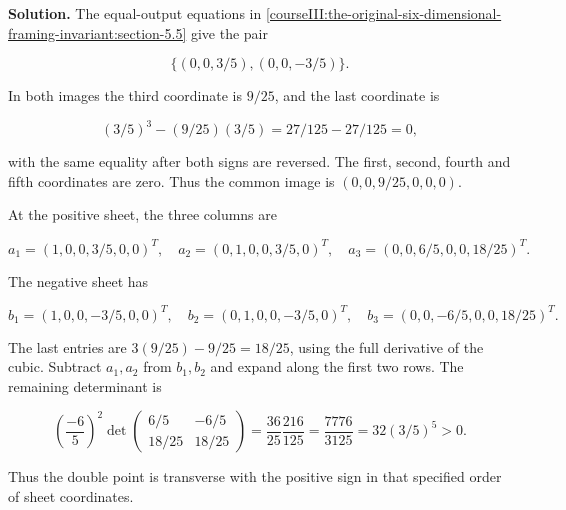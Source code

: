 \textbf{Solution.} The equal-output equations in \cref{courseIII:the-original-six-dimensional-framing-invariant:section-5.5} give the pair

\begin{equation}
\{(0,0,3/5),(0,0,-3/5)\}.
 \label{courseIII:the-original-six-dimensional-framing-invariant:eq:10.1}
\end{equation}

In both images the third coordinate is \(9/25\), and the last coordinate is

\begin{equation}
(3/5)^3-(9/25)(3/5)=27/125-27/125=0,
 \label{courseIII:the-original-six-dimensional-framing-invariant:eq:10.2}
\end{equation}

with the same equality after both signs are reversed. The first, second, fourth and fifth coordinates are zero. Thus the common image is \((0,0,9/25,0,0,0)\).

At the positive sheet, the three columns are

\begin{equation}
a_1=(1,0,0,3/5,0,0)^T,\quad
 a_2=(0,1,0,0,3/5,0)^T,\quad
 a_3=(0,0,6/5,0,0,18/25)^T.
 \label{courseIII:the-original-six-dimensional-framing-invariant:eq:10.3}
\end{equation}

The negative sheet has

\begin{equation}
b_1=(1,0,0,-3/5,0,0)^T,\quad
 b_2=(0,1,0,0,-3/5,0)^T,\quad
 b_3=(0,0,-6/5,0,0,18/25)^T.
 \label{courseIII:the-original-six-dimensional-framing-invariant:eq:10.4}
\end{equation}

The last entries are \(3(9/25)-9/25=18/25\), using the full derivative of the cubic. Subtract \(a_1,a_2\) from \(b_1,b_2\) and expand along the first two rows. The remaining determinant is

\begin{equation}
\left(\frac{-6}{5}\right)^2
   \det\begin{pmatrix}6/5&-6/5\\18/25&18/25\end{pmatrix}
    =\frac{36}{25}\frac{216}{125}
    =\frac{7776}{3125}
    =32(3/5)^5>0.
 \label{courseIII:the-original-six-dimensional-framing-invariant:eq:10.5}
\end{equation}

Thus the double point is transverse with the positive sign in that specified order of sheet coordinates.

